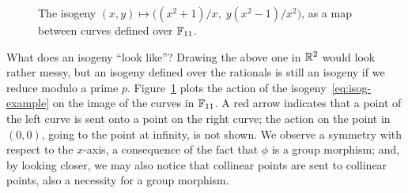 \documentclass[b5layout]{hdr}
\begin{document}
\begin{figure}
  \centering
  \caption{The isogeny $(x,y) \mapsto \bigl((x^2+1)/x,\;y(x^2-1)/x^2\bigr)$,
    as a map between curves defined over $\mathbb{F}_{11}$.}
  \label{fig:isog-example}
\end{figure}


What does an isogeny ``look like''? %
Drawing the above one in $\mathbb{R}^2$ would look rather messy, but an
isogeny defined over the rationals is still an isogeny if we reduce
modulo a prime $p$. %
Figure~\ref{fig:isog-example} plots the action of the
isogeny~\eqref{eq:isog-example} on the image of the curves in
$\mathbb{F}_{11}$. %
A red arrow indicates that a point of the left curve is sent onto a
point on the right curve; the action on the point in $(0,0)$, going to
the point at infinity, is not shown. %
We observe a symmetry with respect to the $x$-axis, a consequence of
the fact that $ϕ$ is a group morphism; and, by looking closer, we may
also notice that collinear points are sent to collinear points, also a
necessity for a group morphism. %
\end{document}
